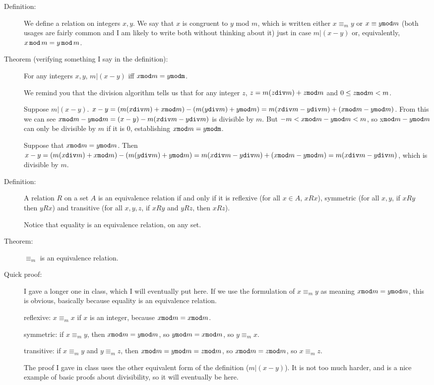 \documentclass[12pt]{article}
\begin{document}
\begin{description}

\item[Definition:]  We define a relation on integers $x,y$.  We say that $x$ is congruent to $y$ mod $m$, which is written either $x\equiv_m y$ or $x \equiv y {\tt mod} m$ (both usages are fairly common and I am likely to write both without thinking about it) just in case $m|(x-y)$ or, equivalently, $x \,{\tt mod} \,m = y \,{\tt mod} \,m$.

\item[Theorem (verifying something I say in the definition):]  For any integers $x,y$, $m|(x-y)$ iff $x{\tt mod}m = y{\tt mod m}$.

We remind you that the division algorithm tells us that for any integer $z$, $z = m(z {\tt div} m)+z{\tt mod} m$ and $0 \leq z{\tt mod} m < m$.

Suppose $m|(x-y)$.  $x-y = (m(x{\tt div} m)+x{\tt mod}m)-(m(y{\tt div} m)+y{\tt mod}m) = m(x{\tt div}m-y{\tt div}m) + (x{\tt mod} m - y{\tt mod} m)$.  From this we can see $x{\tt mod} m - y{\tt mod} m = (x-y)-m(x{\tt div}m-y{\tt div}m)$ is divisible by $m$.  But $-m<x{\tt mod} m - y{\tt mod} m<m$, so x${\tt mod} m - y{\tt mod} m$ can only be divisible by $m$ if it is 0, establishing $x{\tt mod}m = y{\tt mod m}$.

Suppose that $x{\tt mod}m = y{\tt mod} m$.  Then $x-y = (m(x{\tt div} m)+x{\tt mod}m)-(m(y{\tt div} m)+y{\tt mod}m) = m(x{\tt div}m-y{\tt div}m) + (x{\tt mod} m - y{\tt mod} m) = m(x{\tt div}m-y{\tt div}m)$, which is divisible by $m$.

\item[Definition:]  A relation $R$ on a set $A$ is an equivalence relation if and only if it is reflexive (for all $x \in A$, $x R x$), symmetric (for all $x,y$, if $x R y$ then $y R x$) and transitive (for all $x,y,z$, if $x R y$ and $yRz$, then $xRz$).

Notice that equality is an equivalence relation, on any set.

\item[Theorem:]  $\equiv_m$ is an equivalence relation.

\item[Quick proof:]  I gave a longer one in class, which I will eventually put here.  If we use the formulation of $x \equiv_m y$ as meaning $x{\tt mod}m = y{\tt mod} m$, this is obvious, basically because equality is an equivalence relation.

reflexive:  $x \equiv_m x$ if $x$ is an integer, because $x {\tt mod} m = x {\tt mod} m$.

symmetric:  if $x \equiv_m y$, then $x {\tt mod}m = y{\tt mod}m$, so $y {\tt mod}m = x{\tt mod} m$, so $y \equiv_m x$.

transitive:  if $x \equiv_m y$ and $y \equiv_m z$, then $x{\tt mod}m = y{\tt mod} m = z{\tt mod}m$, so $x {\tt mod} m = z{\tt mod} m$, so $x \equiv_m z$.

The proof I gave in class uses the other equivalent form of the definition ($m|(x-y)$).  It is not too much harder, and is a nice example of basic proofs about divisibility, so it will eventually be here.

\end{description}
\end{document}
